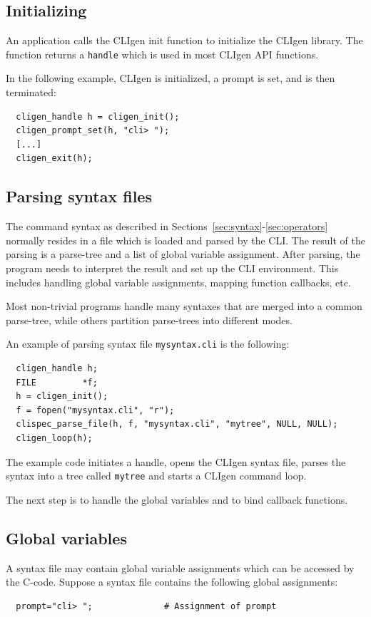 \documentclass[a4paper, 10pt] {article}
\begin{document}
\subsection{Initializing}
\label{sec:handle}

An application calls the CLIgen init function to initialize the CLIgen
library.  The function returns a {\tt handle} which is used in most
CLIgen API functions.

In the following example, CLIgen is initialized, a prompt is set, and
is then terminated:
\begin{verbatim}
  cligen_handle h = cligen_init();
  cligen_prompt_set(h, "cli> ");
  [...]
  cligen_exit(h);
\end{verbatim}

\subsection{Parsing syntax files}
\label{sec:parsing}
The command syntax as described in
Sections~\ref{sec:syntax}-\ref{sec:operators} normally resides in a
file which is loaded and parsed by the CLI. The result of the parsing
is a parse-tree and a list of global variable assignment. After
parsing, the program needs to interpret the result and set up the CLI
environment. This includes handling global variable assignments,
mapping function callbacks, etc. 

Most non-trivial programs handle many syntaxes that are merged into a
common parse-tree, while others partition parse-trees into different
modes.

An example of parsing syntax file {\tt mysyntax.cli} is the following: 
\begin{verbatim}
  cligen_handle h;
  FILE         *f;
  h = cligen_init();
  f = fopen("mysyntax.cli", "r");
  clispec_parse_file(h, f, "mysyntax.cli", "mytree", NULL, NULL);
  cligen_loop(h);
\end{verbatim}

The example code initiates a handle, opens the CLIgen syntax file, parses the
syntax into a tree called {\tt mytree} and starts a CLIgen command loop.

The next step is to handle the global variables and to bind callback
functions.

\subsection{Global variables}
\label{sec:global}

A syntax file may contain global variable assignments which can be
accessed by the C-code. Suppose a syntax file contains the following global assignments:
\begin{verbatim}
  prompt="cli> ";              # Assignment of prompt
\end{verbatim}
\end{document}

